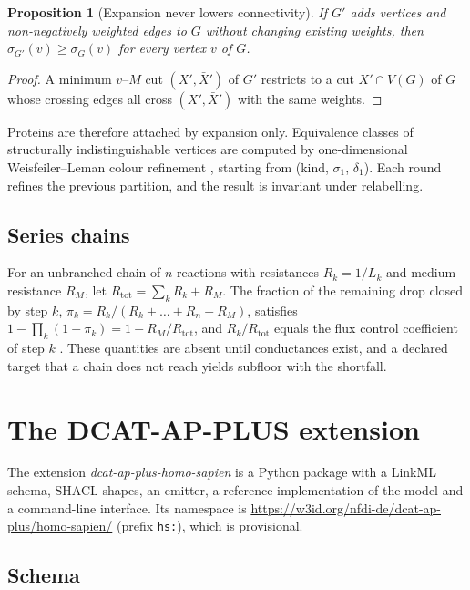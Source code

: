 \documentclass[5p]{elsarticle}
\theoremstyle{definition}
\theoremstyle{plain}
\newtheorem{proposition}{Proposition}
\newcommand{\st}[1]{\textsf{#1}}            %
\begin{document}
\begin{proposition}[Expansion never lowers connectivity]
\label{prop:monotone}
If $G'$ adds vertices and non-negatively weighted edges to $G$ without changing existing weights, then $\sigma_{G'}(v)\ge\sigma_G(v)$ for every vertex $v$ of $G$.
\end{proposition}
\begin{proof}
A minimum $v$--$M$ cut $(X',\bar X')$ of $G'$ restricts to a cut $X'\cap V(G)$ of $G$ whose crossing edges all cross $(X',\bar X')$ with the same weights.
\end{proof}

Proteins are therefore attached by expansion only.
Equivalence classes of structurally indistinguishable vertices are computed by one-dimensional Weisfeiler--Leman colour refinement \citep{weisfeiler1968reduction}, starting from (kind, $\sigma_1$, $\delta_1$).
Each round refines the previous partition, and the result is invariant under relabelling.

\subsection{Series chains}
\label{sec:ladders}

For an unbranched chain of $n$ reactions with resistances $R_k=1/L_k$ and medium resistance $R_M$, let $R_{\mathrm{tot}}=\sum_kR_k+R_M$.
The fraction of the remaining drop closed by step $k$, $\pi_k=R_k/(R_k+\dots+R_n+R_M)$, satisfies $1-\prod_k(1-\pi_k)=1-R_M/R_{\mathrm{tot}}$, and $R_k/R_{\mathrm{tot}}$ equals the flux control coefficient of step $k$ \citep{kacser1973control,heinrich1974linear}.
These quantities are \st{absent} until conductances exist, and a declared target that a chain does not reach yields \st{subfloor} with the shortfall.

\section{The DCAT-AP-PLUS extension}
\label{sec:extension}

The extension \emph{dcat-ap-plus-homo-sapien} is a Python package with a LinkML schema, SHACL shapes, an emitter, a reference implementation of the model and a command-line interface.
Its namespace is \url{https://w3id.org/nfdi-de/dcat-ap-plus/homo-sapien/} (prefix \texttt{hs:}), which is provisional.

\subsection{Schema}
\label{sec:schema}
\end{document}
